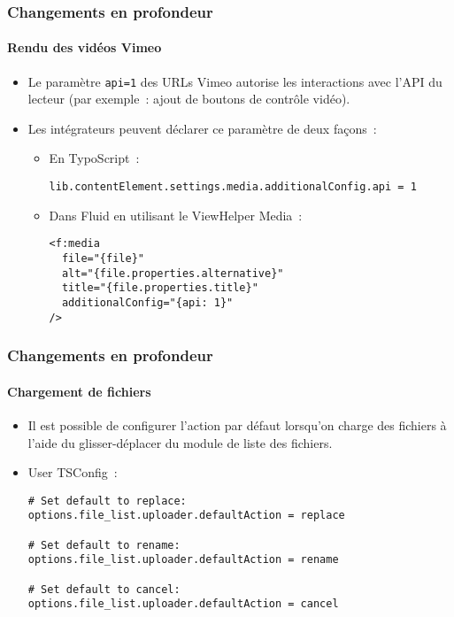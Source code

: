
\begin{frame}[fragile]
	\frametitle{Changements en profondeur}
	\framesubtitle{Rendu des vidéos Vimeo}

	\lstset{basicstyle=\smaller\ttfamily}

	\begin{itemize}
		\item Le paramètre \texttt{api=1} des URLs Vimeo autorise les interactions
			avec l'API du lecteur (par exemple~: ajout de boutons de contrôle vidéo).
		\item Les intégrateurs peuvent déclarer ce paramètre de deux façons~:

		\begin{itemize}
			\item En TypoScript~:

\begin{lstlisting}
lib.contentElement.settings.media.additionalConfig.api = 1
\end{lstlisting}

			\item Dans Fluid en utilisant le ViewHelper Media~:
\begin{lstlisting}
<f:media
  file="{file}"
  alt="{file.properties.alternative}"
  title="{file.properties.title}"
  additionalConfig="{api: 1}"
/>
\end{lstlisting}

		\end{itemize}
	\end{itemize}

\end{frame}


\begin{frame}[fragile]
	\frametitle{Changements en profondeur}
	\framesubtitle{Chargement de fichiers}

	\lstset{basicstyle=\smaller\ttfamily}

	\begin{itemize}
		\item Il est possible de configurer l'action par défaut lorsqu'on charge des fichiers
			à l'aide du glisser-déplacer du module de liste des fichiers.
		\item User TSConfig~:

\begin{lstlisting}
# Set default to replace:
options.file_list.uploader.defaultAction = replace

# Set default to rename:
options.file_list.uploader.defaultAction = rename

# Set default to cancel:
options.file_list.uploader.defaultAction = cancel
\end{lstlisting}

	\end{itemize}

\end{frame}

